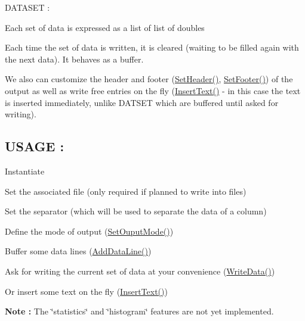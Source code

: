 D\+A\+T\+A\+S\+E\+T \+:~\newline

\begin{DoxyItemize}
\item Each set of data is expressed as a list of list of doubles
\item Each time the set of data is written, it is cleared (waiting to be filled again with the next data). It behaves as a buffer.
\end{DoxyItemize}

We also can customize the header and footer (\hyperlink{classelps_1_1_lab_outputer_a3fce40affff7539f6d59768830fd4e03}{Set\+Header()}, \hyperlink{classelps_1_1_lab_outputer_a03a665502df3322215595a35e624cb85}{Set\+Footer()}) of the output as well as write free entries on the fly (\hyperlink{classelps_1_1_lab_outputer_a21ecad21d95ea286a717a5ec029ee299}{Insert\+Text()} -\/ in this case the text is inserted immediately, unlike D\+A\+T\+S\+E\+T which are buffered until asked for writing).

\subsection*{U\+S\+A\+G\+E \+: }


\begin{DoxyItemize}
\item Instantiate
\item Set the associated file (only required if planned to write into files)
\item Set the separator (which will be used to separate the data of a column)
\item Define the mode of output (\hyperlink{classelps_1_1_lab_outputer_a6af708654be42ff33dcc71816656ad9f}{Set\+Ouput\+Mode()})
\item Buffer some data lines (\hyperlink{classelps_1_1_lab_outputer_a41353b7d293c1902b531eead2a31c644}{Add\+Data\+Line()})
\item Ask for writing the current set of data at your convenience (\hyperlink{classelps_1_1_lab_outputer_a53cc31c61d5fe48be47e3eaa9ee505cf}{Write\+Data()})
\item Or insert some text on the fly (\hyperlink{classelps_1_1_lab_outputer_a21ecad21d95ea286a717a5ec029ee299}{Insert\+Text()})
\end{DoxyItemize}

{\bfseries Note \+:} The \char`\"{}statistics\char`\"{} and \char`\"{}histogram\char`\"{} features are not yet implemented. 

